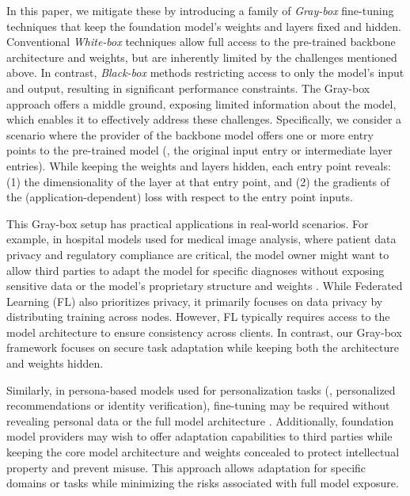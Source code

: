 In this paper, we mitigate these \WB by introducing a family of \emph{Gray-box} fine-tuning techniques that keep the foundation model's weights and layers fixed and hidden. Conventional \emph{White-box} techniques allow full access to the pre-trained backbone architecture and weights, but are inherently limited by the challenges mentioned above. In contrast, \emph{Black-box} methods restricting access to only the model's input and output, resulting in significant performance constraints. The Gray-box approach offers a middle ground, exposing limited information about the model, which enables it to effectively address these challenges. Specifically, we consider a scenario where the provider of the backbone model offers one or more entry points to the pre-trained model (\eg, the original input entry or intermediate layer entries). While keeping the weights and layers hidden, each entry point reveals: (1) the dimensionality of the layer at that entry point, and (2) the gradients of the (application-dependent) loss with respect to the entry point inputs.

This Gray-box setup has practical applications in real-world scenarios. For example, in hospital models used for medical image analysis, where patient data privacy and regulatory compliance are critical, the model owner might want to allow third parties to adapt the model for specific diagnoses without exposing sensitive data or the model’s proprietary structure and weights \citep{federated_learning}. While Federated Learning (FL) also prioritizes privacy, it primarily focuses on data privacy by distributing training across nodes. However, FL typically requires access to the model architecture to ensure consistency across clients. In contrast, our Gray-box framework focuses on secure task adaptation while keeping both the architecture and weights hidden.

Similarly, in persona-based models used for personalization tasks (\eg, personalized recommendations or identity verification), fine-tuning may be required without revealing personal data or the full model architecture \citep{person_reid}. Additionally, foundation model providers may wish to offer adaptation capabilities to third parties while keeping the core model architecture and weights concealed to protect intellectual property and prevent misuse. This approach allows adaptation for specific domains or tasks while minimizing the risks associated with full model exposure.

